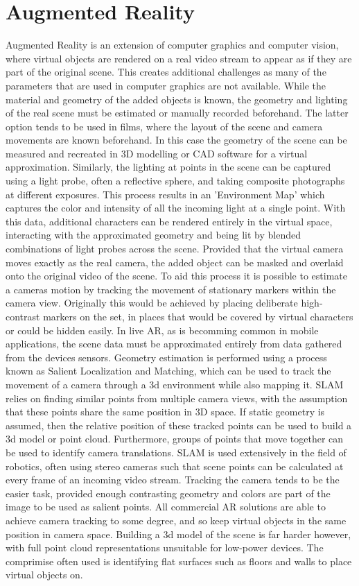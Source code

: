 \documentclass[ %
                    author={Gavin Parker},
                supervisor={Dr. Neill Campbell},
                    degree={MEng},
                     title={Deep Siamese Networks for Illumination Estimation from Stereo Images},
                  subtitle={},
                      type={research},
                      year={2018} ]{dissertation}
\begin{document}
\section{Augmented Reality}
Augmented Reality is an extension of computer graphics and computer vision, where virtual objects are rendered on a real video stream to appear as if they are part of the original scene. This creates additional challenges as many of the parameters that are used in computer graphics are not available. While the material and geometry of the added objects is known, the geometry and lighting of the real scene must be estimated or manually recorded beforehand. The latter option tends to be used in films, where the layout of the scene and camera movements are known beforehand. In this case the geometry of the scene can be measured and recreated in 3D modelling or CAD software for a virtual approximation. Similarly, the lighting at points in the scene can be captured using a light probe, often a reflective sphere, and taking composite photographs at different exposures. This process results in an 'Environment Map' which captures the color and intensity of all the incoming light at a single point. With this data, additional characters can be rendered entirely in the virtual space, interacting with the approximated geometry and being lit by blended combinations of light probes across the scene. Provided that the virtual camera moves exactly as the real camera, the added object can be masked and overlaid onto the original video of the scene. To aid this process it is possible to estimate a cameras motion by tracking the movement of stationary markers within the camera view. Originally this would be achieved by placing deliberate high-contrast markers on the set, in places that would be covered by virtual characters or could be hidden easily.
\newline
In live AR, as is becomming common in mobile applications, the scene data must be approximated entirely from data gathered from the devices sensors. Geometry estimation is performed using a process known as Salient Localization and Matching, which can be used to track the movement of a camera through a 3d environment while also mapping it. SLAM relies on finding similar points from multiple camera views, with the assumption that these points share the same position in 3D space. If static geometry is assumed, then the relative position of these tracked points can be used to build a 3d model or point cloud. Furthermore, groups of points that move together can be used to identify camera translations. SLAM is used extensively in the field of robotics, often using stereo cameras such that scene points can be calculated at every frame of an incoming video stream. Tracking the camera tends to be the easier task, provided enough contrasting geometry and colors are part of the image to be used as salient points. All commercial AR solutions are able to achieve camera tracking to some degree, and so keep virtual objects in the same position in camera space. Building a 3d model of the scene is far harder however, with full point cloud representations unsuitable for low-power devices. The comprimise often used is identifying flat surfaces such as floors and walls to place virtual objects on.
\end{document}
